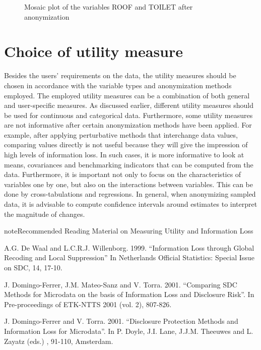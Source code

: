 \documentclass[letterpaper,10pt,english]{sphinxmanual}
\begin{document}
\begin{figure}[htbp]
\centering
\capstart

\noindent{}
\caption{Mosaic plot of the variables ROOF and TOILET after anonymization}\label{\detokenize{utility:fig69}}\label{\detokenize{utility:id12}}\end{figure}


\section{Choice of utility measure}
\label{\detokenize{utility:choice-of-utility-measure}}
Besides the users’ requirements on the data, the utility measures should
be chosen in accordance with the variable types and anonymization
methods employed. The employed utility measures can be a combination of
both general and user-specific measures. As discussed earlier, different
utility measures should be used for continuous and categorical data.
Furthermore, some utility measures are not informative after certain
anonymization methods have been applied. For example, after applying
perturbative methods that interchange data values, comparing values
directly is not useful because they will give the impression of high
levels of information loss. In such cases, it is more informative to
look at means, covariances and benchmarking indicators that can be
computed from the data. Furthermore, it is important not only to focus
on the characteristics of variables one by one, but also on the
interactions between variables. This can be done by cross-tabulations
and regressions. In general, when anonymizing sampled data, it is
advisable to compute confidence intervals around estimates to interpret
the magnitude of changes.

\begin{sphinxadmonition}{note}{Recommended Reading Material on Measuring Utility and Information Loss}

A.G. De Waal and L.C.R.J. Willenborg. 1999. “Information Loss through
Global Recoding and Local Suppression” In Netherlands Official
Statistics: Special Issue on SDC, 14, 17-10.

J. Domingo-Ferrer, J.M. Mateo-Sanz and V. Torra. 2001. “Comparing SDC
Methods for Microdata on the basis of Information Loss and Disclosure
Risk”. In Pre-proceedings of ETK-NTTS 2001 (vol. 2), 807-826.

J. Domingo-Ferrer and V. Torra. 2001. “Disclosure Protection Methods and
Information Loss for Microdata”. In P. Doyle, J.I. Lane, J.J.M. Theeuwes
and L. Zayatz (eds.) , 91-110, Amsterdam.
\end{sphinxadmonition}
\end{document}

